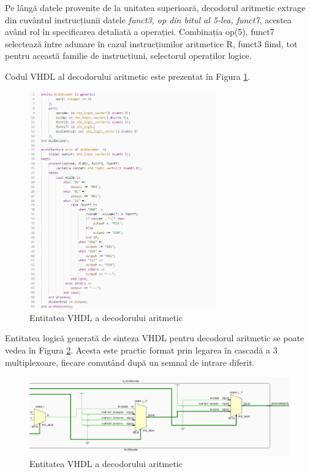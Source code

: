 \documentclass[12pt]{article}
\begin{document}
Pe lângă datele provenite de la unitatea superioară, decodorul aritmetic extrage din cuvântul instrucțiunii datele \textit{funct3, op din bitul al 5-lea, funct7}, acestea având rol în specificarea detaliată a operației. Combinația op(5), funct7 selectează între adunare în cazul instrucțiunilor aritmetice R, funct3 fiind, tot pentru această familie de instrucțiuni, selectorul operaților logice.

Codul VHDL al decodorului aritmetic este prezentat în Figura  \ref{Figura:46}.

  \begin{figure}[h!]
 \includegraphics[width=0.72\textwidth]{aludecodercode.png}
 \centering
 \caption{Entitatea VHDL a decodorului aritmetic}
 \label{Figura:46}
 \end{figure}

\newpage

Entitatea logică generată de sinteza VHDL pentru decodorul aritmetic se poate vedea în Figura \ref{Figura:47}. Acesta este practic format prin legarea în cascadă a 3 multiplexoare, fiecare comutând după un semnal de intrare diferit.
 
  \begin{figure}[h!]
 \includegraphics[width=1.0\textwidth]{aludecoder2.png}
 \centering
 \caption{Entitatea VHDL a decodorului aritmetic}
 \label{Figura:47}
 \end{figure}
 
\end{document}
